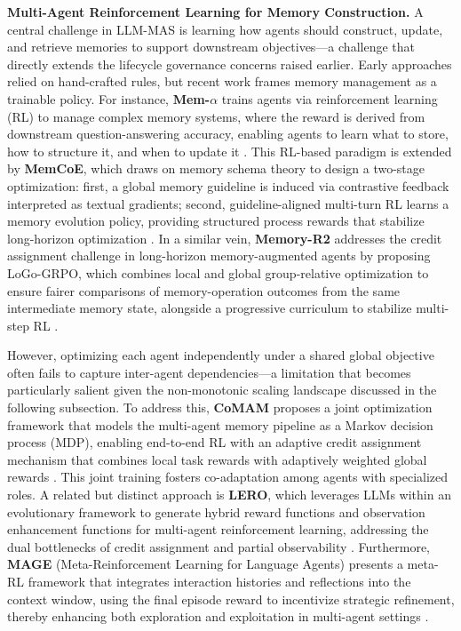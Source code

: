 \documentclass[11pt]{article}
\begin{document}
\textbf{Multi-Agent Reinforcement Learning for Memory Construction.} A central challenge in LLM-MAS is learning how agents should construct, update, and retrieve memories to support downstream objectives---a challenge that directly extends the lifecycle governance concerns raised earlier. Early approaches relied on hand-crafted rules, but recent work frames memory management as a trainable policy. For instance, \textbf{Mem-\(\alpha\)} trains agents via reinforcement learning (RL) to manage complex memory systems, where the reward is derived from downstream question-answering accuracy, enabling agents to learn what to store, how to structure it, and when to update it \cite{ref147}. This RL-based paradigm is extended by \textbf{MemCoE}, which draws on memory schema theory to design a two-stage optimization: first, a global memory guideline is induced via contrastive feedback interpreted as textual gradients; second, guideline-aligned multi-turn RL learns a memory evolution policy, providing structured process rewards that stabilize long-horizon optimization \cite{ref148}. In a similar vein, \textbf{Memory-R2} addresses the credit assignment challenge in long-horizon memory-augmented agents by proposing LoGo-GRPO, which combines local and global group-relative optimization to ensure fairer comparisons of memory-operation outcomes from the same intermediate memory state, alongside a progressive curriculum to stabilize multi-step RL \cite{ref149}.

However, optimizing each agent independently under a shared global objective often fails to capture inter-agent dependencies---a limitation that becomes particularly salient given the non-monotonic scaling landscape discussed in the following subsection. To address this, \textbf{CoMAM} proposes a joint optimization framework that models the multi-agent memory pipeline as a Markov decision process (MDP), enabling end-to-end RL with an adaptive credit assignment mechanism that combines local task rewards with adaptively weighted global rewards \cite{ref150}. This joint training fosters co-adaptation among agents with specialized roles. A related but distinct approach is \textbf{LERO}, which leverages LLMs within an evolutionary framework to generate hybrid reward functions and observation enhancement functions for multi-agent reinforcement learning, addressing the dual bottlenecks of credit assignment and partial observability \cite{ref151}. Furthermore, \textbf{MAGE} (Meta-Reinforcement Learning for Language Agents) presents a meta-RL framework that integrates interaction histories and reflections into the context window, using the final episode reward to incentivize strategic refinement, thereby enhancing both exploration and exploitation in multi-agent settings \cite{ref152}.
\end{document}
